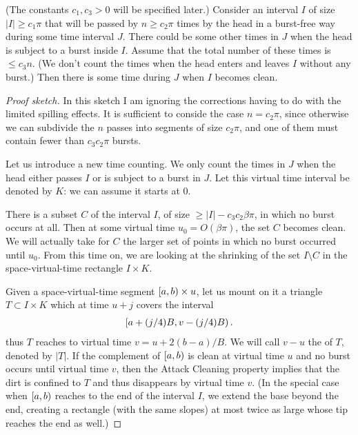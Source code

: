 \documentclass[12pt]{memoir}
\renewcommand{\le}{\leq}
\renewcommand{\ge}{\geq}
\def\B{B}
\begin{document}
\begin{lemma}\label{lem:dirty-passes}
(The constants \( c_{1},c_{3}>0 \) will be specified later.)
Consider an interval \( I \) of size \( |I|\ge c_{1}\pi \) 
that will be passed by \( n\ge c_{2}\pi \) times
by the head in a burst-free way during some time interval \( J \).
There could be some other times in \( J \) when the head is subject to a burst inside \( I \).
Assume that the total number of these times is \( \le c_{3} n \).
(We don't count the times when the head enters and leaves \( I \) without
any burst.)
Then there is some time during \( J \) when \( I \) becomes clean.
\end{lemma}
\begin{proof}[Proof sketch]
In this sketch I am ignoring the corrections having to do with the
limited spilling effects.
It is sufficient to conside the case \( n=c_{2}\pi \), since otherwise
we can subdivide the \( n \) passes into segments of size \( c_{2}\pi \),
and one of them must contain fewer than \( c_{3}c_{2}\pi \) bursts.

Let us introduce a new  time counting.
We only count the times in \( J \) when the head either passes \( I \)
or is subject to a burst in \( J \).
Let this virtual time interval be denoted by \( K \): we can assume it starts at 0.

There is a subset \( C \) of the interval \( I \),
of size \( \ge |I|-c_{3}c_{2}\beta\pi \), in which no burst occurs at all.
Then at some virtual time \( u_{0}=O(\beta\pi) \), the set \( C \) becomes clean.
We will actually take for \( C \) the larger set of points in which no burst occurred until
\( u_{0} \).
From this time on, we are looking at the shrinking of the set \( I\setminus C \)
in the space-virtual-time rectangle \( I\times K \).

Given a space-virtual-time segment \( \left[a,b\right)\times u \),
let us mount on it a triangle \( T\subset I\times K \)
which at time \( u+j \) covers the interval
 \begin{align*}
 \lint{a+(j/4)\B}{v-(j/4)\B}.
 \end{align*}
thus \( T \) reaches to virtual time \( v=u+2(b-a)/\B \).
We will call \( v-u \) the  of \( T \), denoted by \( |T| \).
If the complement of \( \left[a,b\right) \) is clean at virtual time \( u \)
and no burst occurs until virtual time 
\( v \), then the Attack Cleaning property implies that the dirt
is confined to \( T \) and thus disappears by virtual time \( v \).
(In the special case when \( \left[a,b\right) \) reaches to the end of the interval \( I \),
we extend the base beyond the end, creating a rectangle (with the same slopes)
at most twice as large whose tip reaches the end as well.)


\end{proof}
\end{document}

